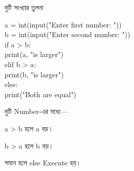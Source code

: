 \begin{codeoutputbox}{দুটি সংখ্যার তুলনা}

\noindent
\begin{minipage}[t]{0.57\linewidth}
\codeheading

\begin{english}
\ttfamily
a = int(input("Enter first number: "))\\
b = int(input("Enter second number: "))\\[0.5mm]
if a > b:\\
\hspace*{4mm}print(a, "is larger")\\
elif b > a:\\
\hspace*{4mm}print(b, "is larger")\\
else:\\
\hspace*{4mm}print("Both are equal")
\end{english}

\end{minipage}
\hfill
\begin{minipage}[t]{0.39\linewidth}
\outputheading

দুটি Number-এর মধ্যে—

\medskip

\textenglish{\ttfamily a > b}
হলে
\textenglish{\ttfamily a}
বড়।

\medskip

\textenglish{\ttfamily b > a}
হলে
\textenglish{\ttfamily b}
বড়।

\medskip

সমান হলে
\textenglish{\ttfamily else}
Execute হয়।

\end{minipage}

\end{codeoutputbox}



